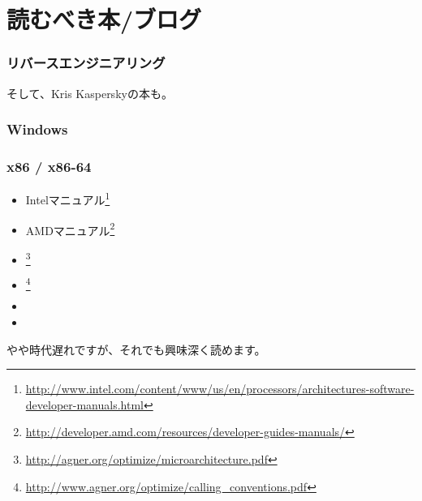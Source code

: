 \chapter{読むべき本/ブログ}


\subsection{リバースエンジニアリング}



そして、Kris Kasperskyの本も。

\subsection{Windows}



\subsection{\CCpp}



\subsection{x86 / x86-64}

\label{x86_manuals}
\begin{itemize}
\item Intelマニュアル\footnote{\AlsoAvailableAs \url{http://www.intel.com/content/www/us/en/processors/architectures-software-developer-manuals.html}}

\item AMDマニュアル\footnote{\AlsoAvailableAs \url{http://developer.amd.com/resources/developer-guides-manuals/}}

\item \AgnerFog{}\footnote{\AlsoAvailableAs \url{http://agner.org/optimize/microarchitecture.pdf}}

\item \AgnerFogCC{}\footnote{\AlsoAvailableAs \url{http://www.agner.org/optimize/calling_conventions.pdf}}

\item \IntelOptimization

\item \AMDOptimization
\end{itemize}

やや時代遅れですが、それでも興味深く読めます。

